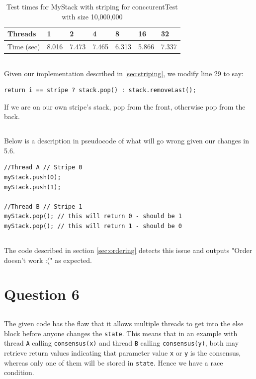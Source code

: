 \documentclass[a5paper]{article}
\begin{document}
\begin{table}[ht!]
\centering
\begin{tabular}{|l|l|l|l|l|l|l|}
\hline
Threads & 1 & 2 & 4 & 8 & 16 & 32 \\ \hline
Time (sec) & 8.016 & 7.473 & 7.465 & 6.313 & 5.866 & 7.337 \\ \hline
\end{tabular}
\caption{Test times for MyStack with striping for conccurentTest with size 10,000,000}
\label{table:striping}
\end{table}

\subsection{}
Given our implementation described in \ref{sec:striping}, we modify line 29 to say:
\begin{lstlisting}
return i == stripe ? stack.pop() : stack.removeLast();
\end{lstlisting}
If we are on our own stripe's stack, pop from the front, otherwise pop from the back.

\subsection{}
Below is a description in pseudocode of what will go wrong given our changes in 5.6.

\begin{lstlisting}
//Thread A // Stripe 0
myStack.push(0);
myStack.push(1);

//Thread B // Stripe 1
myStack.pop(); // this will return 0 - should be 1
myStack.pop(); // this will return 1 - should be 0
\end{lstlisting}

\subsection{}
The code described in section \ref{sec:ordering} detects this issue and outputs "Order doesn't work :(" as expected.

\section{Question 6}
\subsection{}
The given code has the flaw that it allows multiple threads to get into the else block before anyone changes the \texttt{state}.
This means that in an example with thread \texttt{A} calling \texttt{consensus(x)} and thread \texttt{B} calling \texttt{consensus(y)}, both may retrieve return values
indicating that parameter value \texttt{x} or \texttt{y} is the consensus, whereas only one of them will be stored in \texttt{state}. Hence we have a race condition.
\end{document}
